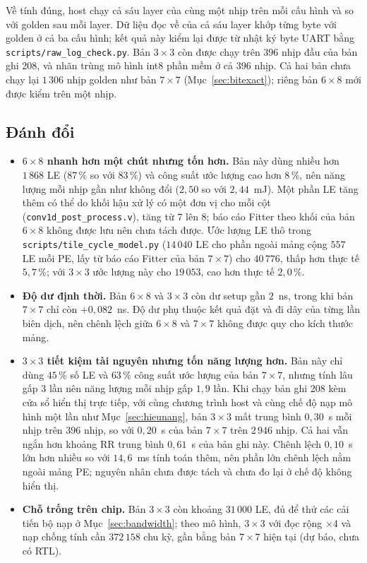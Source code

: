 Về tính đúng, host chạy cả sáu layer của cùng một nhịp trên mỗi cấu hình và so với golden sau mỗi layer.
Dữ liệu đọc về của cả sáu layer khớp từng byte với golden ở cả ba cấu hình; kết quả này kiểm lại được từ nhật ký byte UART bằng \texttt{scripts/raw\_log\_check.py}.
Bản $3\times3$ còn được chạy trên $396$ nhịp đầu của bản ghi 208, và nhãn trùng mô hình int8 phần mềm ở cả $396$ nhịp.
Cả hai bản chưa chạy lại $1\,306$ nhịp golden như bản $7\times7$ (Mục~\ref{sec:bitexact}); riêng bản $6\times8$ mới được kiểm trên một nhịp.

\subsection{Đánh đổi}
\begin{itemize}
  \item \textbf{$6\times8$ nhanh hơn một chút nhưng tốn hơn.} Bản này dùng nhiều hơn $1\,868$ LE ($87\,\%$ so với $83\,\%$) và công suất ước lượng cao hơn $8\,\%$, nên năng lượng mỗi nhịp gần như không đổi ($2{,}50$ so với $2{,}44$~mJ).
  Một phần LE tăng thêm có thể do khối hậu xử lý có một đơn vị cho mỗi cột (\texttt{conv1d\_post\_process.v}), tăng từ $7$ lên $8$; báo cáo Fitter theo khối của bản $6\times8$ không được lưu nên chưa tách được.
  Ước lượng LE thô trong \texttt{scripts/tile\_cycle\_model.py} ($14\,040$ LE cho phần ngoài mảng cộng $557$ LE mỗi PE, lấy từ báo cáo Fitter của bản $7\times7$) cho $40\,776$, thấp hơn thực tế $5{,}7\,\%$; với $3\times3$ ước lượng này cho $19\,053$, cao hơn thực tế $2{,}0\,\%$.
  \item \textbf{Độ dư định thời.} Bản $6\times8$ và $3\times3$ còn dư setup gần $2$~ns, trong khi bản $7\times7$ chỉ còn $+0{,}082$~ns.
  Độ dư phụ thuộc kết quả đặt và đi dây của từng lần biên dịch, nên chênh lệch giữa $6\times8$ và $7\times7$ không được quy cho kích thước mảng.
  \item \textbf{$3\times3$ tiết kiệm tài nguyên nhưng tốn năng lượng hơn.} Bản này chỉ dùng $45\,\%$ số LE và $63\,\%$ công suất ước lượng của bản $7\times7$, nhưng tính lâu gấp $3$ lần nên năng lượng mỗi nhịp gấp $1{,}9$ lần.
  Khi chạy bản ghi 208 kèm cửa sổ hiển thị trực tiếp, với cùng chương trình host và cùng chế độ nạp mô hình một lần như Mục~\ref{sec:hieunang}, bản $3\times3$ mất trung bình $0{,}30$~s mỗi nhịp trên $396$ nhịp, so với $0{,}20$~s của bản $7\times7$ trên $2\,946$ nhịp.
  Cả hai vẫn ngắn hơn khoảng RR trung bình $0{,}61$~s của bản ghi này.
  Chênh lệch $0{,}10$~s lớn hơn nhiều so với $14{,}6$~ms tính toán thêm, nên phần lớn chênh lệch nằm ngoài mảng PE; nguyên nhân chưa được tách và chưa đo lại ở chế độ không hiển thị.
  \item \textbf{Chỗ trống trên chip.} Bản $3\times3$ còn khoảng $31\,000$ LE, đủ để thử các cải tiến bộ nạp ở Mục~\ref{sec:bandwidth}; theo mô hình, $3\times3$ với đọc rộng $\times4$ và nạp chồng tính cần $372\,158$ chu kỳ, gần bằng bản $7\times7$ hiện tại (dự báo, chưa có RTL).
\end{itemize}
